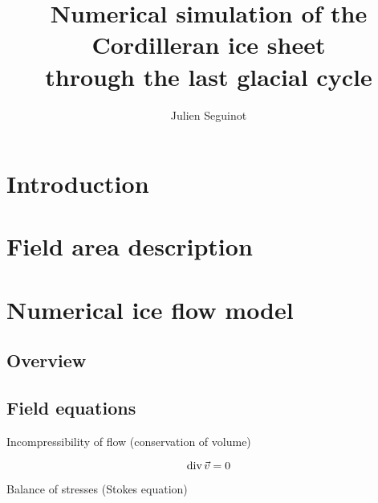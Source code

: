 \documentclass{article}
\title{Numerical simulation of the Cordilleran ice sheet \\
       through the last glacial cycle}
\author{Julien Seguinot}
\renewcommand{\div}[1]{\textup{div}\,#1}
\begin{document}

\maketitle
\linenumbers

\section{Introduction}
\label{sec:intro}


\section{Field area description}


\section{Numerical ice flow model}
\subsection{Overview}
\subsection{Field equations}

Incompressibility of flow (conservation of volume)

\begin{equation}
    \div{\vec{v}} = 0
\end{equation}

Balance of stresses (Stokes equation)
\end{document}
